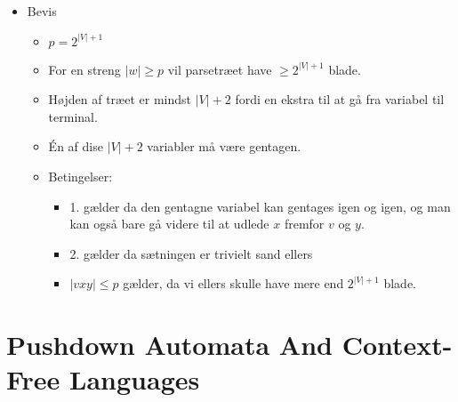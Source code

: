 \begin{itemize}
\begin{itemize}
\begin{itemize}
		            \end{itemize}
		      \item Bevis
		            \begin{itemize}
			            \item $p = 2^{|V|+1}$
			            \item For en streng $|w| \ge p$ vil parsetræet have $\ge 2^{|V|+1}$ blade.
			            \item Højden af træet er mindst $|V|+2$ fordi en ekstra til at gå fra variabel til terminal.
			            \item Én af dise $|V|+2$ variabler må være gentagen.
			            \item Betingelser:
			                  \begin{itemize}
				                  \item 1. gælder da den gentagne variabel kan gentages igen og igen, og man kan også bare gå videre til at udlede $x$ fremfor $v$ og $y$.
				                  \item 2. gælder da sætningen er trivielt sand ellers
				                  \item $|vxy| \le p$ gælder, da vi ellers skulle have mere end $2^{|V|+1}$ blade.
			                  \end{itemize}
		            \end{itemize}
	      \end{itemize}
\end{itemize}

\section*{Pushdown Automata And Context-Free Languages}

